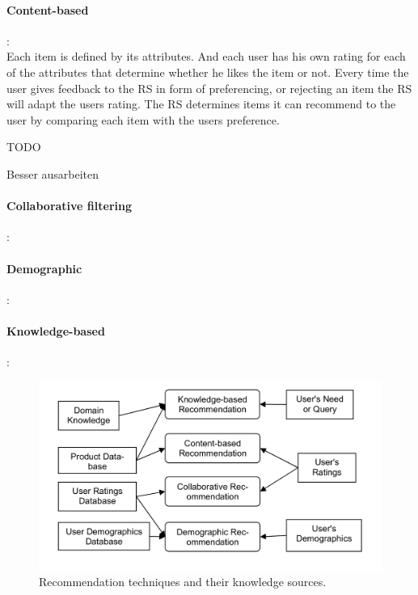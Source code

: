 \paragraph{Content-based}:~\\
Each item is defined by its attributes.
And each user has his own rating for each of the attributes that determine whether he likes the item or not.
Every time the user gives feedback to the RS in form of preferencing, or rejecting an item the RS will adapt the users rating.
The RS determines items it can recommend to the user by comparing each item with the users preference.

TODO

Besser ausarbeiten

\paragraph{Collaborative filtering}:~\\

\paragraph{Demographic}:~\\

\paragraph{Knowledge-based}:~\\


\citep[p.~75]{lops:2011}



\begin{figure}[h]
    \center
    \includegraphics[scale=0.3]{inc/recommendersystems/RecommendationTechniquesAndKnowledgeSources.png}
    \caption{Recommendation techniques and their knowledge sources.\citep[p.~379]{burke:2007}}
\end{figure}

